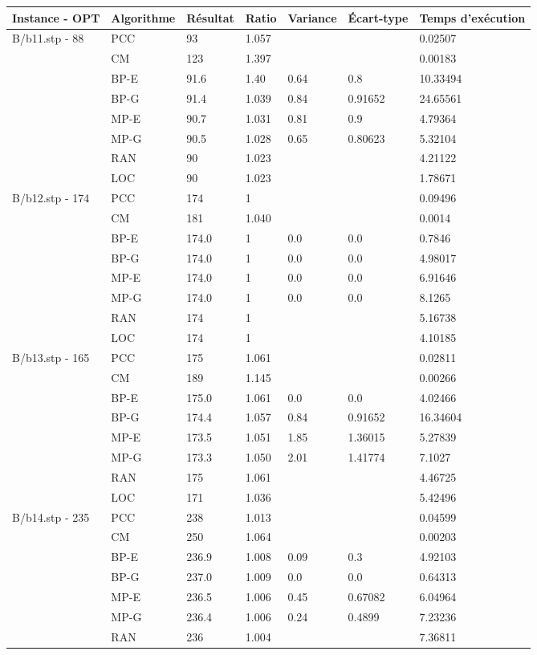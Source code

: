 \documentclass[12pt,a4paper]{article}
\begin{document}
\begin{center}
	\begin{tabular}{l|l|l|l|l|l|l}
		Instance - OPT & Algorithme & Résultat & Ratio & Variance & Écart-type & Temps d'exécution\\ \hline \hline
		B/b11.stp - 88&PCC&93&1.057&&&0.02507\\
		&CM&123&1.397&&&0.00183\\
		&BP-E&91.6&1.40&0.64&0.8&10.33494\\
		&BP-G&91.4&1.039&0.84&0.91652&24.65561\\
		&MP-E&90.7&1.031&0.81&0.9&4.79364\\
		&MP-G&90.5&1.028&0.65&0.80623&5.32104\\
		&RAN&90&1.023&&&4.21122\\
		&LOC&90&1.023&&&1.78671\\\hline
		B/b12.stp - 174&PCC&174&1&&&0.09496\\
		&CM&181&1.040&&&0.0014\\
		&BP-E&174.0&1&0.0&0.0&0.7846\\
		&BP-G&174.0&1&0.0&0.0&4.98017\\
		&MP-E&174.0&1&0.0&0.0&6.91646\\
		&MP-G&174.0&1&0.0&0.0&8.1265\\
		&RAN&174&1&&&5.16738\\
		&LOC&174&1&&&4.10185\\\hline
		B/b13.stp - 165&PCC&175&1.061&&&0.02811\\
		&CM&189&1.145&&&0.00266\\
		&BP-E&175.0&1.061&0.0&0.0&4.02466\\
		&BP-G&174.4&1.057&0.84&0.91652&16.34604\\
		&MP-E&173.5&1.051&1.85&1.36015&5.27839\\
		&MP-G&173.3&1.050&2.01&1.41774&7.1027\\
		&RAN&175&1.061&&&4.46725\\
		&LOC&171&1.036&&&5.42496\\\hline
		B/b14.stp - 235&PCC&238&1.013&&&0.04599\\
		&CM&250&1.064&&&0.00203\\
		&BP-E&236.9&1.008&0.09&0.3&4.92103\\
		&BP-G&237.0&1.009&0.0&0.0&0.64313\\
		&MP-E&236.5&1.006&0.45&0.67082&6.04964\\
		&MP-G&236.4&1.006&0.24&0.4899&7.23236\\
		&RAN&236&1.004&&&7.36811\\

\end{tabular}
\end{center}
\end{document}
